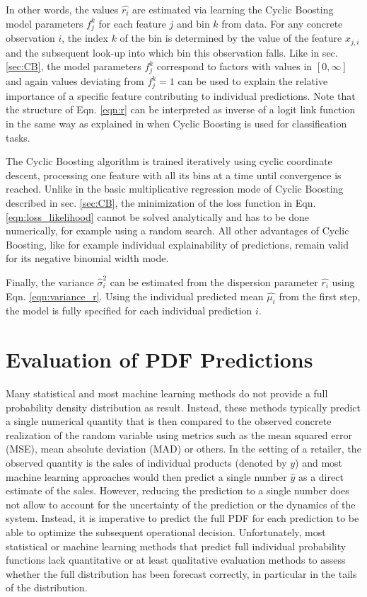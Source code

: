 \documentclass[BCOR=1mm, DIV=calc,10pt,
twoside=true,
twocolumn,
headings=normal]{scrartcl}
\newcommand{\eqn}{Eqn. }
\begin{document}
In other words, the values $\hat{r_i}$ are estimated via learning the Cyclic Boosting model parameters $f^k_j$ for each feature $j$ and bin $k$ from data. For any concrete observation $i$, the index $k$ of the bin is determined by the value of the feature $x_{j,i}$ and the subsequent look-up into which bin this observation falls. Like in sec. \ref{sec:CB}, the model parameters $f^k_j$ correspond to factors with values in $[0, \infty]$ and again values deviating from $f^k_j=1$ can be used to explain the relative importance of a specific feature contributing to individual predictions. Note that the structure of \eqn \eqref{eqn:r} can be interpreted as inverse of a logit link function in the same way as explained in \cite{Wick2019} when Cyclic Boosting is used for classification tasks.

The Cyclic Boosting algorithm is trained iteratively using cyclic coordinate descent, processing one feature with all its bins at a time until convergence is reached. Unlike in the basic multiplicative regression mode of Cyclic Boosting described in sec. \ref{sec:CB}, the minimization of the loss function in \eqn \eqref{eqn:loss_likelihood} cannot be solved analytically and has to be done numerically, for example using a random search. All other advantages of Cyclic Boosting, like for example individual explainability of predictions, remain valid for its negative binomial width mode.

Finally, the variance $\hat{\sigma}^2_i$ can be estimated from the dispersion parameter $\hat{r_i}$ using \eqn \eqref{eqn:variance_r}. Using  the individual predicted mean $\hat{\mu_i}$ from the first step, the model is fully specified for each individual prediction $i$.


\section{Evaluation of PDF Predictions}
\label{sec:pdfEvaluation}

Many statistical and most machine learning methods do not provide a full probability density distribution as result. Instead, these methods typically predict a single numerical quantity that is then compared to the observed concrete realization of the random variable using metrics such as the mean squared error (MSE),  mean absolute deviation (MAD) or others. In the setting of a retailer, the observed quantity is the sales of individual products (denoted by $y$) and most machine learning approaches would then predict a single number $\hat{y}$ as a direct estimate of the sales. However, reducing the prediction to a single number does not allow to account for the uncertainty of the prediction or the dynamics of the system. Instead, it is imperative to predict the full PDF for each prediction to be able to optimize the subsequent operational decision. Unfortunately, most statistical or machine learning methods that predict full individual probability functions lack quantitative or at least qualitative evaluation methods to assess whether the full distribution has been forecast correctly, in particular in the tails of the distribution.
\end{document}
